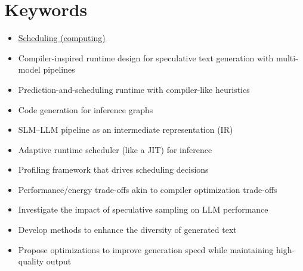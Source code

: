 \documentclass[a4paper,12pt]{report}
\begin{document}
\section*{Keywords}
\begin{itemize}
    \item \href{https://en.wikipedia.org/wiki/Scheduling_(computing)}{Scheduling (computing)}
    \item Compiler-inspired runtime design for speculative text generation with multi-model pipelines
    \item Prediction-and-scheduling runtime with compiler-like heuristics
    \item Code generation for inference graphs
    \item SLM–LLM pipeline as an intermediate representation (IR)
    \item Adaptive runtime scheduler (like a JIT) for inference
    \item Profiling framework that drives scheduling decisions
    \item Performance/energy trade-offs akin to compiler optimization trade-offs
    \item Investigate the impact of speculative sampling on LLM performance
    \item Develop methods to enhance the diversity of generated text
    \item Propose optimizations to improve generation speed while maintaining high-quality output
\end{itemize}
\end{document}

